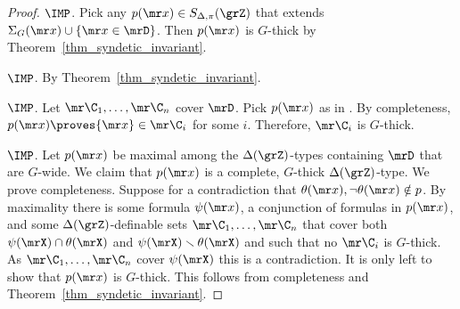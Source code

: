 \begin{proof}
  $\IMP$.
  Pick any $p({\mr x})\in S_{\Delta,\pi}(\grZ)$ that extends $\Sigma_G({\mr x})\cup\{{\mr x}\in\mrD\}$.
  Then $p({\mr x})$ is $G$-thick by Theorem~\ref{thm_syndetic_invariant}.

  $\IMP$.
  By Theorem~\ref{thm_syndetic_invariant}.

  $\IMP$.
  Let ${\mr\C_1},\dots,{\mr\C_n}$ cover $\mrD$.
  Pick $p({\mr x})$ as in .
  By completeness, $p({\mr x})\proves {\mr x}\in{\mr\C_i}$ for some $i$.
  Therefore, ${\mr\C_i}$ is $G$-thick.

  $\IMP$.
  Let $p({\mr x})$ be maximal among the $\Delta(\grZ)$-types containing $\mrD$ that are $G$-wide.
  We claim that $p({\mr x})$ is a complete, $G$-thick $\Delta(\grZ)$-type.
  We prove completeness.
  Suppose for a contradiction that $\theta({\mr x}),\neg\theta({\mr x})\notin p$.
  By maximality there is some formula $\psi({\mr x})$, a conjunction of formulas in $p({\mr x})$, and some $\Delta(\grZ)$-definable sets ${\mr\C_1},\dots,{\mr\C_n}$ that cover both $\psi(\mrX)\cap\theta(\mrX)$ and $\psi(\mrX)\smallsetminus\theta(\mrX)$ and such that no ${\mr\C_i}$ is $G$-thick.
  As ${\mr\C_1},\dots,{\mr\C_n}$ cover $\psi(\mrX)$ this is a contradiction.
  It is only left to show that $p({\mr x})$ is $G$-thick.
  This follows from completeness and Theorem~\ref{thm_syndetic_invariant}.
\end{proof}





